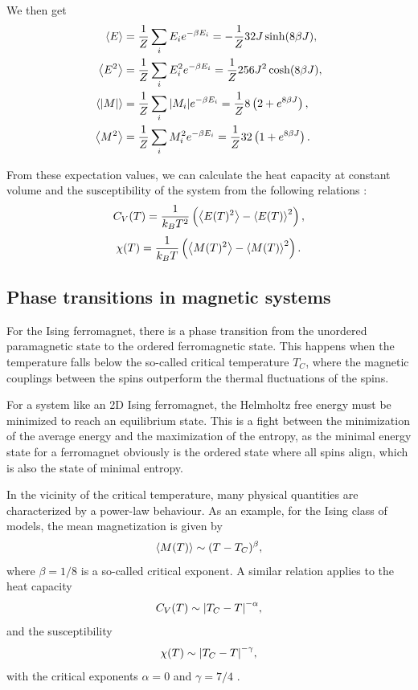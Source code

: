\documentclass[%
 reprint,
nofootinbib,
aps,
]{revtex4-1}
\begin{document}
We then get
\begin{align}\label{eq:expvals}
\ev{E} &= \frac{1}{Z} \sum_i E_i e^{-\beta E_i} = -\frac{1}{Z}32J\sinh (8\beta J),\\
\ev{E^2} &= \frac{1}{Z} \sum_i E_i^2 e^{-\beta E_i} = \frac{1}{Z}256J^2\cosh (8\beta J),\\
\ev{\abs{M}} &= \frac{1}{Z} \sum_i \abs{M_i} e^{-\beta E_i} = \frac{1}{Z}8\left(2 + e^{8\beta J}\right),\\
\ev{M^2} &= \frac{1}{Z} \sum_i M_i^2 e^{-\beta E_i} = \frac{1}{Z}32\left( 1 + e^{8\beta J}\right).
\end{align}

From these expectation values, we can calculate the heat capacity at constant volume and the susceptibility of the system from the following relations \cite{hjorten}:
\begin{equation}\label{eq:heatcap}
C_V(T) = \frac{1}{k_BT^2}\left(\ev{E(T)^2} - \ev{E(T)}^2\right),
\end{equation}
\begin{equation}\label{eq:suscept}
\chi(T) = \frac{1}{k_B T}\left(\ev{M(T)^2} - \ev{M(T)}^2\right).
\end{equation}



\subsection{Phase transitions in magnetic systems}

For the Ising ferromagnet, there is a phase transition from the unordered paramagnetic state to the ordered ferromagnetic state. This happens when the temperature falls below the so-called critical temperature $T_C$, where the magnetic couplings between the spins outperform the thermal fluctuations of the spins.

For a system like an 2D Ising ferromagnet, the Helmholtz free energy must be minimized to reach an equilibrium state. This is a fight between the minimization of the average energy and the maximization of the entropy, as the minimal energy state for a ferromagnet obviously is the ordered state where all spins align, which is also the state of minimal entropy.


In the vicinity of the critical temperature, many physical quantities are characterized by a power-law behaviour. As an example, for the Ising class of models, the mean magnetization is given by
\begin{equation}
\ev{M(T)} \sim (T - T_C)^\beta,
\end{equation}
where $\beta = 1/8$ is a so-called critical exponent. A similar relation applies to the heat capacity
\begin{equation}
C_V(T) \sim \abs{T_C - T}^{-\alpha},
\end{equation}
and the susceptibility
\begin{equation}
\chi (T) \sim \abs{T_C -T}^{-\gamma},
\end{equation}
with the critical exponents $\alpha = 0$ and $\gamma = 7/4$ \cite{flekkoy, hjorten}.
\end{document}
